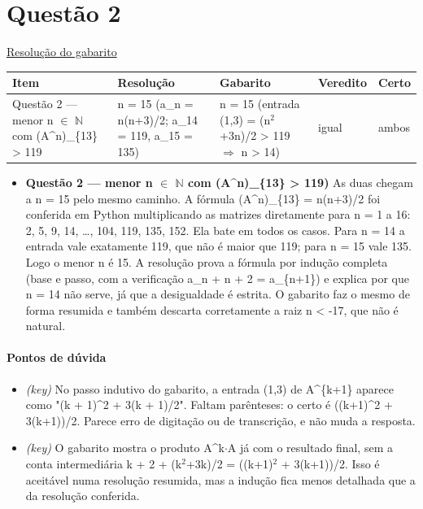 \documentclass{article}%
\begin{document}
\section*{Questão 2}%
\href{https://poliedroresolve.sistemapoliedro.com.br/vestibulares/ita/2026/ita-2-fase-dia-1-28-10-2025-2-fase-dia-1/dissertativa-2-matematica-2-fase-dia-1-ita-2026}{Resolução do gabarito}\par\smallskip%
\begin{longtable}{@{}p{} p{} p{} p{} p{}@{}}\toprule Item & Resolução & Gabarito & Veredito & Certo \\ \midrule
Questão 2 --- menor n $\in$ $\mathbb{N}$ com (A\^{}n)\_\{13\} > 119 & n = 15 (a\_n = n(n+3)/2; a\_14 = 119, a\_15 = 135) & n = 15 (entrada (1,3) = (n$^2$+3n)/2 > 119 $\Rightarrow$ n > 14) & igual & ambos \\
\bottomrule\end{longtable}%
\begin{itemize}%
\item%
\textbf{Questão 2 --- menor n $\in$ $\mathbb{N}$ com (A\^{}n)\_\{13\} > 119)} As duas chegam a n = 15 pelo mesmo caminho. A fórmula (A\^{}n)\_\{13\} = n(n+3)/2 foi conferida em Python multiplicando as matrizes diretamente para n = 1 a 16: 2, 5, 9, 14, \ldots{}, 104, 119, 135, 152. Ela bate em todos os casos. Para n = 14 a entrada vale exatamente 119, que não é maior que 119; para n = 15 vale 135. Logo o menor n é 15. A resolução prova a fórmula por indução completa (base e passo, com a verificação a\_n + n + 2 = a\_\{n+1\}) e explica por que n = 14 não serve, já que a desigualdade é estrita. O gabarito faz o mesmo de forma resumida e também descarta corretamente a raiz n < -17, que não é natural.%
\end{itemize}%
\paragraph{Pontos de dúvida}%
\begin{itemize}%
\item%
\textit{(key)} No passo indutivo do gabarito, a entrada (1,3) de A\^{}\{k+1\} aparece como "(k + 1)\^{}2 + 3(k + 1)/2". Faltam parênteses: o certo é ((k+1)\^{}2 + 3(k+1))/2. Parece erro de digitação ou de transcrição, e não muda a resposta.%
\item%
\textit{(key)} O gabarito mostra o produto A\^{}k$\cdot$A já com o resultado final, sem a conta intermediária k + 2 + (k$^2$+3k)/2 = ((k+1)$^2$ + 3(k+1))/2. Isso é aceitável numa resolução resumida, mas a indução fica menos detalhada que a da resolução conferida.%
\end{itemize}%
\end{document}

